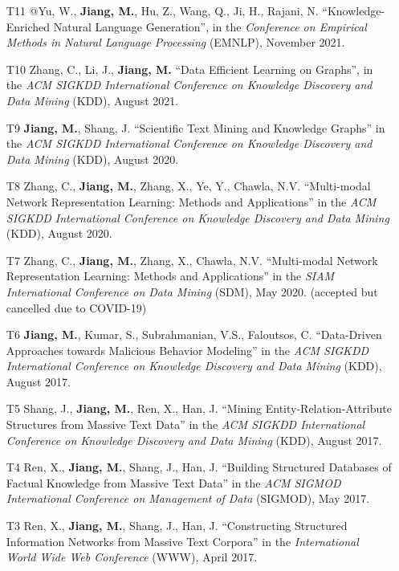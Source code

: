 \documentclass[10pt]{article}
\newenvironment{myindentpar}[1]%
{\begin{list}{}%
         {\setlength{\leftmargin}{#1}}%
         \item[]%
}
{\end{list}}
\newcounter{list}
\begin{document}
\begin{myindentpar}{0.00cm}
\begin{enumerate}[leftmargin=.5cm]
\item[T11] @Yu, W., \textbf{Jiang, M.}, Hu, Z., Wang, Q., Ji, H., Rajani, N. ``Knowledge-Enriched Natural Language Generation'', in the \textit{Conference on Empirical Methods in Natural Language Processing} (EMNLP), November 2021.

\item[T10] Zhang, C., Li, J., \textbf{Jiang, M.} ``Data Efficient Learning on Graphs'', in the \textit{ACM SIGKDD International Conference on Knowledge Discovery and Data Mining} (KDD), August 2021.
		
\item[T9] \textbf{Jiang, M.}, Shang, J. ``Scientific Text Mining and Knowledge Graphs'' in the \textit{ACM SIGKDD International Conference on Knowledge Discovery and Data Mining} (KDD), August 2020.
		
\item[T8] Zhang, C., \textbf{Jiang, M.}, Zhang, X., Ye, Y., Chawla, N.V. ``Multi-modal Network Representation Learning: Methods and Applications'' in the \textit{ACM SIGKDD International Conference on Knowledge Discovery and Data Mining} (KDD), August 2020.

\item[T7] Zhang, C., \textbf{Jiang, M.}, Zhang, X., Chawla, N.V. ``Multi-modal Network Representation Learning: Methods and Applications'' in the \textit{SIAM International Conference on Data Mining} (SDM), May 2020. (accepted but cancelled due to COVID-19)

\item[T6] \textbf{Jiang, M.}, Kumar, S., Subrahmanian, V.S., Faloutsos, C. ``Data-Driven Approaches towards Malicious Behavior Modeling'' in the \textit{ACM SIGKDD International Conference on Knowledge Discovery and Data Mining} (KDD), August 2017.

\item[T5] Shang, J., \textbf{Jiang, M.}, Ren, X., Han, J. ``Mining Entity-Relation-Attribute Structures from Massive Text Data'' in the \textit{ACM SIGKDD International Conference on Knowledge Discovery and Data Mining} (KDD), August 2017.

\item[T4] Ren, X., \textbf{Jiang, M.}, Shang, J., Han, J. ``Building Structured Databases of Factual Knowledge from Massive Text Data'' in the \textit{ACM SIGMOD International Conference on Management of Data} (SIGMOD), May 2017.
		
\item[T3] Ren, X., \textbf{Jiang, M.}, Shang, J., Han, J. ``Constructing Structured Information Networks from Massive Text Corpora'' in the \textit{International World Wide Web Conference}  (WWW), April 2017.


\end{enumerate}
\end{myindentpar}
\end{document}

